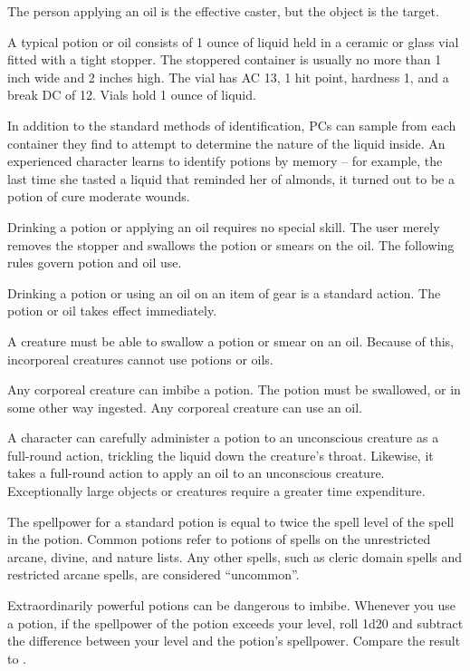 The person applying an oil is the effective caster, but the object is the target.

 A typical potion or oil consists of 1 ounce of liquid held in a ceramic or glass vial fitted with a tight stopper.
The stoppered container is usually no more than 1 inch wide and 2 inches high.
The vial has AC 13, 1 hit point, hardness 1, and a break DC of 12.
Vials hold 1 ounce of liquid.

 In addition to the standard methods of identification, PCs can sample from each container they find to attempt to determine the nature of the liquid inside.
An experienced character learns to identify potions by memory -- for example, the last time she tasted a liquid that reminded her of almonds, it turned out to be a potion of cure moderate wounds.

 Drinking a potion or applying an oil requires no special skill.
The user merely removes the stopper and swallows the potion or smears on the oil.
The following rules govern potion and oil use.

Drinking a potion or using an oil on an item of gear is a standard action.
The potion or oil takes effect immediately.

A creature must be able to swallow a potion or smear on an oil.
Because of this, incorporeal creatures cannot use potions or oils.

Any corporeal creature can imbibe a potion.
The potion must be swallowed, or in some other way ingested.
Any corporeal creature can use an oil.

A character can carefully administer a potion to an unconscious creature as a full-round action, trickling the liquid down the creature's throat.
Likewise, it takes a full-round action to apply an oil to an unconscious creature.
Exceptionally large objects or creatures require a greater time expenditure.

 The spellpower for a standard potion is equal to twice the spell level of the spell in the potion.
Common potions refer to potions of spells on the unrestricted arcane, divine, and nature lists.
Any other spells, such as cleric domain spells and restricted arcane spells, are considered ``uncommon''.

 Extraordinarily powerful potions can be dangerous to imbibe.
Whenever you use a potion, if the spellpower of the potion exceeds your level, roll 1d20 and subtract the difference between your level and the potion's spellpower.
Compare the result to .

